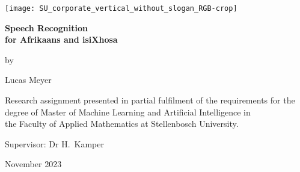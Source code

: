 \graphicspath{{frontmatter/fig/}}

\begin{titlepage}
	\begin{center}
		
        \texttt{[image: SU\_corporate\_vertical\_without\_slogan\_RGB-crop]}
				
		\vfill
		
		{\sffamily \bfseries \huge Speech Recognition \\for Afrikaans and isiXhosa \par}
		
		\vfill
		
        {\large by \\[5pt]}
		{\large {\Large Lucas Meyer} \par}
		
		\vfill
		
		\vfill
		
		
		
		{\large Research assignment presented in partial fulfilment of the requirements for the degree of Master of Machine Learning and Artificial Intelligence in \\the Faculty of Applied Mathematics at Stellenbosch University. \par}
		
		
		\vfill
		
		{\large {Supervisor}: Dr H.\ Kamper}\par
		
		\vfill
		
		{\Large November 2023}
	\end{center}
\end{titlepage}
